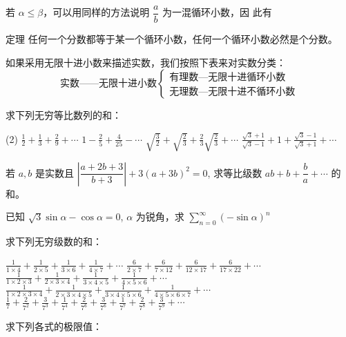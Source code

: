 若 $\alpha\le \beta$，可以用同样的方法说明 $\dfrac{a}{b}$ 为一混循环小数，因
此有
\begin{Theorem}{定理}
    任何一个分数都等于某一个循环小数，任何一个循环小数必然是个分数。
\end{Theorem}

如果采用无限十进小数来描述实数，我们按照下表来对实数分类：
\[\text{实数——无限十进小数}\begin{cases}
    \text{有理数—无限十进循环小数}\\
    \text{无理数—无限十进不循环小数}
\end{cases}\]

\begin{Exercise}
\begin{question}
    \item 求下列无穷等比数列的和：
  \begin{tasks}(2)
    \task $\displaystyle \frac{1}{2}+\frac{1}{3}+\frac{2}{9}+\cdots$
    \task $\displaystyle 1-\frac{2}{5}+\frac{4}{25}-\cdots$
    \task $\displaystyle \sqrt{\frac{3}{2}}+\sqrt{\frac{2}{3}}+\frac{2}{3}\sqrt{\frac{2}{3}}+\cdots$
    \task $\displaystyle \frac{\sqrt{3}+1}{\sqrt{3}-1}+1+\frac{\sqrt{3}-1}{\sqrt{3}+1}+\cdots$
  \end{tasks}        
  \item 若 $a,b$ 是实数且 $\left|\dfrac{a+2b+3}{b+3}\right|+3(a+3b)^2=0$, 求等比级数 $ab+b+\dfrac{b}{a}+\cdots$ 的和。
  \item 已知 $\sqrt{3}\sin\alpha-\cos\alpha=0$, $\alpha$ 为锐角，求 $\sum\limits^{\infty}_{n=0}(-\sin\alpha)^n$
  \item 求下列无穷级数的和：
  \begin{tasks}
    \task $\displaystyle \frac{1}{1 \times 4}+\frac{1}{2 \times 5}+\frac{1}{3 \times 6}+\frac{1}{4 \times 7}+\cdots$
    \task $\displaystyle \frac{6}{2 \times 7}+\frac{6}{7 \times 12}+\frac{6}{12 \times 17}+\frac{6}{17 \times 22}+\cdots$
    \task $\displaystyle \frac{1}{1 \times 2 \times 3}+\frac{1}{2 \times 3 \times 4}+\frac{1}{3 \times 4 \times 5}+\frac{1}{4 \times 5 \times 6}+\cdots$
    \task $\displaystyle \frac{1}{1 \times 2 \times 3 \times 4}+\frac{1}{2 \times 3 \times 4 \times 5}+\frac{1}{3 \times 4 \times 5 \times 6}+\frac{1}{4 \times 5 \times 6 \times 7}+\cdots$
    \task $\displaystyle \frac{1}{7}+\frac{2}{7^{2}}+\frac{3}{7^{3}}+\frac{1}{7^{4}}+\frac{2}{7^{6}}+\frac{3}{7^{6}}+\frac{1}{7^{7}}+\frac{2}{7^{8}}+\frac{3}{7^{9}}+\cdots$
  \end{tasks}
  \item 求下列各式的极限值：

\end{question}
\end{Exercise}

